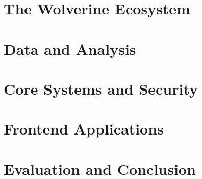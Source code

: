 ﻿\documentclass[11pt,a4paper,twoside,openright]{report}
\theoremstyle{definition}
\theoremstyle{remark}
\begin{document}


\tableofcontents
\listoffigures
\listoftables

\part{The Wolverine Ecosystem}



\part{Data and Analysis}



\part{Core Systems and Security}



\part{Frontend Applications}



\part{Evaluation and Conclusion}



\appendix












\end{document}
